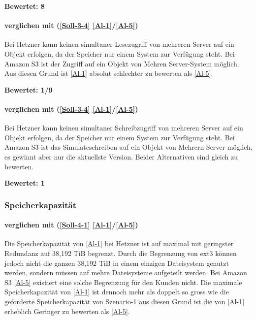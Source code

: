 \textbf{Bewertet: 8} 


\paragraph*{  verglichen mit  (\ref{Soll-3-4} \ref{Al-1}/\ref{Al-5})}
Bei Hetzner kann keinen simultaner Lesezugriff von mehreren Server auf ein Objekt erfolgen, da der Speicher nur einem System zur Verfügung steht. Bei Amazon S3 ist der Zugriff auf ein Objekt von Mehren Server-System möglich. Aus diesen Grund ist  \ref{Al-1} absolut schlechter zu bewerten als  \ref{Al-5}.

\textbf{Bewertet: 1/9} 

\paragraph*{  verglichen mit  (\ref{Soll-3-4} \ref{Al-1}/\ref{Al-5})}
Bei Hetzner kann keinen simultaner Schreibzugriff von mehreren Server auf ein Objekt erfolgen, da der Speicher nur einem System zur Verfügung steht. Bei Amazon S3 ist das Simulateschreiben auf ein Objekt von Mehrern Server möglich, es gewinnt aber nur die aktuellste Version.
Beider Alternativen sind gleich zu bewerten.

\textbf{Bewertet: 1}

\subsubsection{Speicherkapazität}

\paragraph*{  verglichen mit  (\ref{Soll-4-1} \ref{Al-1}/\ref{Al-5})} 
Die Speicherkapazität von \ref{Al-1} bei Hetzner ist auf maximal mit geringster Redundanz auf 38,192 TiB begrenzt. Durch die Begrenzung von ext3 können jedoch nicht die ganzen 38,192 TiB in einem einzigen Dateisystem genutzt werden, sondern müssen auf mehre Dateisysteme aufgeteilt werden. Bei Amazon S3 \ref{Al-5} existiert eine solche Begrenzung für den Kunden nicht. Die maximale Speicherkapazität von \ref{Al-1} ist dennoch mehr als doppelt so gross wie die geforderte Speicherkapazität von Szenario-1 aus diesen Grund ist die  von \ref{Al-1} erheblich Geringer zu bewerten als \ref{Al-5}.


